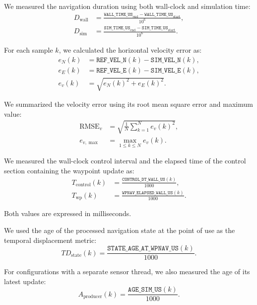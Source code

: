 \noindent We measured the navigation duration using both wall-clock and simulation time:
\begin{align}
D_{\mathrm{wall}} &=
\frac{
\texttt{WALL\_TIME\_US}_{\mathrm{end}}-
\texttt{WALL\_TIME\_US}_{\mathrm{start}}
}{10^6}, \\
D_{\mathrm{sim}} &=
\frac{
\texttt{SIM\_TIME\_US}_{\mathrm{end}}-
\texttt{SIM\_TIME\_US}_{\mathrm{start}}
}{10^6}.
\end{align}

\noindent For each sample \(k\), we calculated the horizontal velocity error as:
\begin{align}
e_N(k) &=
\texttt{REF\_VEL\_N}(k)-\texttt{SIM\_VEL\_N}(k), \\
e_E(k) &=
\texttt{REF\_VEL\_E}(k)-\texttt{SIM\_VEL\_E}(k), \\
e_v(k) &= \sqrt{e_N(k)^2+e_E(k)^2}.
\end{align}

\noindent We summarized the velocity error using its root mean square error and maximum value:
\begin{align}
\mathrm{RMSE}_v &=
\sqrt{\frac{1}{N}\sum_{k=1}^{N}e_v(k)^2}, \\
e_{v,\max} &= \max_{1\leq k\leq N}e_v(k).
\end{align}

\noindent We measured the wall-clock control interval and the elapsed time of the control section containing the waypoint update as:
\begin{align}
T_{\mathrm{control}}(k) &=
\frac{\texttt{CONTROL\_DT\_WALL\_US}(k)}{1000}, \\
T_{\mathrm{wp}}(k) &=
\frac{\texttt{WPNAV\_ELAPSED\_WALL\_US}(k)}{1000}.
\end{align}

\noindent Both values are expressed in milliseconds.

\noindent We used the age of the processed navigation state at the point of use as the temporal displacement metric:
\begin{equation}
TD_{\mathrm{state}}(k)=
\frac{\texttt{STATE\_AGE\_AT\_WPNAV\_US}(k)}{1000}.
\end{equation}

\noindent For configurations with a separate sensor thread, we also measured the age of its latest update:
\begin{equation}
A_{\mathrm{producer}}(k)=
\frac{\texttt{AGE\_SIM\_US}(k)}{1000}.
\end{equation}

